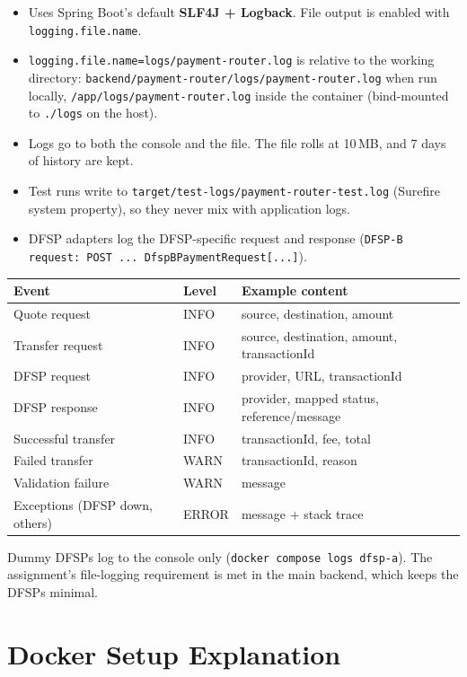 \documentclass[12pt,a4paper]{article}
\begin{document}
\begin{itemize}
\item Uses Spring Boot's default \textbf{SLF4J + Logback}. File output is enabled
with \texttt{logging.file.name}.
\item \texttt{logging.file.name=logs/payment-router.log} is relative to the working
directory: \texttt{backend/payment-router/logs/payment-router.log} when run
locally, \texttt{/app/logs/payment-router.log} inside the container (bind-mounted to
\texttt{./logs} on the host).
\item Logs go to both the console and the file. The file rolls at 10\,MB, and 7 days
of history are kept.
\item Test runs write to \texttt{target/test-logs/payment-router-test.log} (Surefire
system property), so they never mix with application logs.
\item DFSP adapters log the DFSP-specific request and response (\texttt{DFSP-B
request: POST ... DfspBPaymentRequest[...]}).
\end{itemize}

\begin{longtable}{L{0.30\textwidth} L{0.10\textwidth} L{0.42\textwidth}}
\toprule
\textbf{Event} & \textbf{Level} & \textbf{Example content} \\
\midrule
\endhead
Quote request & INFO & source, destination, amount \\
Transfer request & INFO & source, destination, amount, transactionId \\
DFSP request & INFO & provider, URL, transactionId \\
DFSP response & INFO & provider, mapped status, reference/message \\
Successful transfer & INFO & transactionId, fee, total \\
Failed transfer & WARN & transactionId, reason \\
Validation failure & WARN & message \\
Exceptions (DFSP down, others) & ERROR & message + stack trace \\
\bottomrule
\end{longtable}

Dummy DFSPs log to the console only (\texttt{docker compose logs dfsp-a}). The
assignment's file-logging requirement is met in the main backend, which keeps the
DFSPs minimal.

\clearpage
\section{Docker Setup Explanation}
\label{sec:docker}
\end{document}
